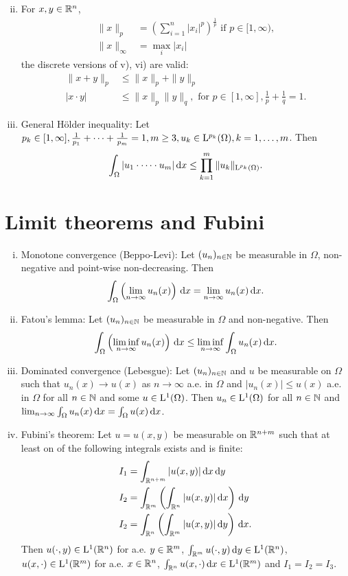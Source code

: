\begin{enumerate}[i)]
$$    $$
  \item For $x,y \in \mathbb{R}^n$,
    \begin{align*}
      \|x\|_p &= \left( \sum_{i = 1}^n |x_i|^p  \right)^{\frac{1}{p}} \text{ if } p \in [1,\infty), \\
        \|x\|_{\infty} &= \max_{i} |x_i|
    \end{align*}
    the discrete versions of v), vi) are valid:
    \begin{align*}
      \|x + y\|_p &\leq \|x\|_p + \|y\|_p \\
      |x \cdot y| &\leq \|x\|_p \|y\|_q, \text{ for } p \in [1, \infty], \frac{1}{p} + \frac{1}{q} =1.
    \end{align*}
  \item General Hölder inequality: Let $p_k \in [1,\infty], \frac{1}{p_1} + \cdots+ \frac{1}{p_m} = 1, m \geq 3, u_k \in \mathrm{L}^{p_k}(\Omega), k = 1,\dots,m$.
    Then
    $$
    \int_\Omega |u_1 \cdot \cdots \cdot u_m| \, {\operatorname{d}\!{x}} \leq \prod_{k = 1}^m \|u_k\|_{\mathrm{L}^{p_k}(\Omega)}.
    $$
\end{enumerate}

\section{Limit theorems and Fubini}

\begin{enumerate}[i)]
  \item Monotone convergence (Beppo-Levi): Let $(u_n)_{n \in \mathbb{N}}$ be measurable in $\Omega$, non-negative and point-wise non-decreasing. Then
    $$
    \int_\Omega \left( \lim_{n \to \infty} u_n(x) \right) \, {\operatorname{d}\!{x}} = \lim_{n \to \infty} u_n(x) \, {\operatorname{d}\!{x}}.
    $$
  \item Fatou's lemma: Let $(u_n)_{n \in \mathbb{N}}$ be measurable in $\Omega$ and non-negative. Then
    $$
    \int_\Omega \left( \liminf_{n \to \infty} u_n(x) \right) \, {\operatorname{d}\!{x}} 
    \leq \liminf_{n \to \infty} \int_\Omega u_n(x) \, {\operatorname{d}\!{x}}.
    $$
  \item Dominated convergence (Lebesgue): Let $(u_n)_{n \in \mathbb{N}}$ and $u$ be measurable on $\Omega$ such that $u_n(x) \to u(x)$ as $n \to \infty$ a.e. in $\Omega$ and $|u_n(x)| \leq u(x)$ a.e. in $\Omega$ for all $n \in \mathbb{N}$ and some $u \in \mathrm{L}^1(\Omega)$.
    Then $u_n \in \mathrm{L}^1(\Omega)$ for all $n \in \mathbb{N}$ and $\lim_{n \to \infty} \int_\Omega u_n(x) \, {\operatorname{d}\!{x}} = \int_\Omega u(x) \, {\operatorname{d}\!{x}}$.
  \item Fubini's theorem: Let $u = u(x,y)$ be measurable on $\mathbb{R}^{n + m}$ such that at least on of the following integrals exists and is finite:
    \begin{align*}
      I_1 &= \int_{\mathbb{R}^{n + m}} |u(x,y)| \, {\operatorname{d}\!{x}} \, {\operatorname{d}\!{y}} \\
      I_2 &= \int_{\mathbb{R}^m} \left( \int_{\mathbb{R}^n} |u(x,y)| \, {\operatorname{d}\!{x}} \right) \, {\operatorname{d}\!{y}} \\
      I_2 &= \int_{\mathbb{R}^n} \left( \int_{\mathbb{R}^m} |u(x,y)| \, {\operatorname{d}\!{y}} \right) \, {\operatorname{d}\!{x}}.
    \end{align*}
    Then $u(\cdot,y) \in \mathrm{L}^1(\mathbb{R}^n)$ for a.e. $y \in \mathbb{R}^m$, $\int_{\mathbb{R}^m} u(\cdot,y) \, {\operatorname{d}\!{y}} \in \mathrm{L}^1(\mathbb{R}^n)$, $u(x,\cdot) \in \mathrm{L}^1(\mathbb{R}^m)$ for a.e. $x \in \mathbb{R}^n$, $\int_{\mathbb{R}^n} u(x, \cdot) \, {\operatorname{d}\!{x}} \in \mathrm{L}^1(\mathbb{R}^m)$ and $I_1 = I_2 = I_3$.
\end{enumerate}

